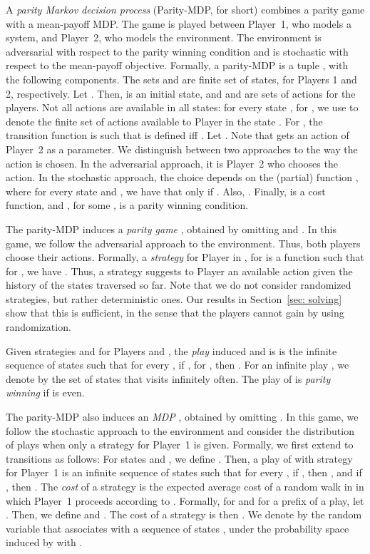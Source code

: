 \documentclass[runningheads,a4paper]{llncs}
\begin{document}
A {\em parity Markov decision process\/} (Parity-MDP, for short) combines a parity game with a mean-payoff MDP. The game is played between Player~1, who models a 
system, and Player~2, who models the environment. The environment is adversarial with respect to the parity winning condition and is stochastic with respect to the mean-payoff objective. Formally, a parity-MDP is a tuple
, with the following components. The sets  and  are finite set of states, for Players 1 and 2, respectively. Let . Then,  is an initial state, and  and  are sets of actions for the players. Not all actions are available in all states: for every state , for , we use  to denote the finite set of actions available to Player  in the state . 
For , the transition function  is such that  is defined iff . Let . 
Note that  gets an action of Player~2 as a parameter. We distinguish between two approaches to the way the action is chosen. In the adversarial approach, it is Player~2 who chooses the action. In the stochastic approach, the choice depends on the (partial) function , where for every state  and , we have that  only if . Also, . Finally,  is a cost function, and  , for some , is a parity winning condition.

The parity-MDP   induces a {\em parity game\/} , obtained by omitting  and . In this game, we follow the adversarial approach to the environment. Thus, both players choose their actions. Formally, 
a {\em strategy} for Player   in , for  is a function  such that for , we have . Thus, a strategy suggests to Player  an available action given the history of the states traversed so far.  
Note that we do not consider randomized strategies, but rather deterministic ones. 
Our results in Section~\ref{sec: solving} show that this is sufficient, in the sense that the players cannot gain by using randomization.

Given strategies  and  for Players  and , the {\em play} induced  and  is 
is the infinite sequence of states  such that for every , if , for , then . For an infinite play , we denote by  the set of states that  visits infinitely often.
The play  of  is {\em parity winning} if  is even. 

The parity-MDP   also induces an {\em MDP\/} , obtained by omitting . In this game, we follow the stochastic approach to the environment and consider the distribution of plays when only a strategy for Player~1 is given. Formally, we first extend  to transitions as follows: For states  and , we define .
Then, a play of  with strategy  for Player~1 is an infinite sequence of states  such that for every , if , then , and if , then . 
The {\em cost} of a strategy  is the expected average cost of a random walk in  in which Player~1 proceeds according to . Formally, for  and for a prefix  of a play, let . Then, we define  and . 
The cost of a strategy  is then  .
We denote by  the random variable that associates  with a sequence of states , under the probability space induced by  with .
\end{document}
